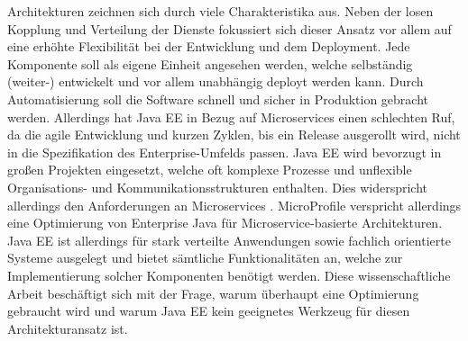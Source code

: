  Architekturen zeichnen sich durch viele Charakteristika aus. Neben der losen Kopplung und Verteilung der Dienste fokussiert sich dieser Ansatz vor allem auf eine erhöhte Flexibilität bei der Entwicklung und dem Deployment. Jede Komponente soll als eigene Einheit angesehen werden, welche selbständig (weiter-) entwickelt und vor allem unabhängig deployt werden kann. Durch Automatisierung soll die Software schnell und sicher in Produktion gebracht werden. Allerdings hat Java EE in Bezug auf Microservices einen schlechten Ruf, da die agile Entwicklung und kurzen Zyklen, bis ein Release ausgerollt wird, nicht in die Spezifikation des Enterprise-Umfelds passen. Java EE wird bevorzugt in großen Projekten eingesetzt, welche oft komplexe Prozesse und unflexible Organisations- und Kommunikationsstrukturen enthalten. Dies widerspricht allerdings den Anforderungen an Microservices \cite{jaxcenter.2016}. MicroProfile verspricht allerdings eine Optimierung von Enterprise Java für Microservice-basierte Architekturen.
Java EE ist allerdings für stark verteilte Anwendungen sowie fachlich orientierte Systeme ausgelegt und bietet sämtliche Funktionalitäten an, welche zur Implementierung solcher Komponenten benötigt werden. Diese wissenschaftliche Arbeit beschäftigt sich mit der Frage, warum überhaupt eine Optimierung gebraucht wird und warum Java EE kein geeignetes Werkzeug für diesen Architekturansatz ist. 
